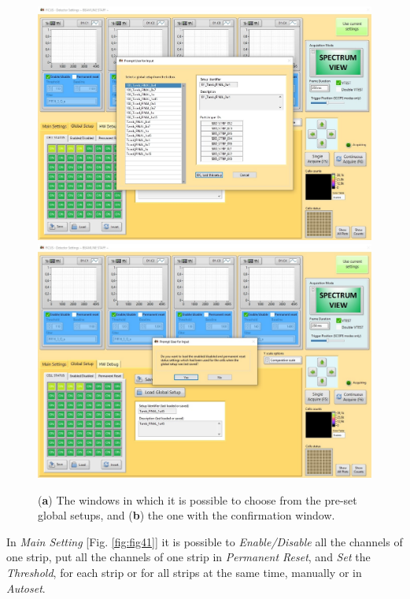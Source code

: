 \documentclass[a4paper,12pt,oneside,pdflatex,italian,final,twocolumn]{article}
\begin{document}
\begin{figure}[h]
\centering
\subfloat
{\includegraphics[width=.85\textwidth]{Cattura100.jpg}} \\
\subfloat
{\includegraphics[width=.85\textwidth]{Cattura101.jpg}} 
\caption{(\textbf{a}) The windows in which it is possible to choose from the pre-set global setups, and (\textbf{b}) the one with the confirmation window.}\label{fig:fig40}
\end{figure}

In \textit{Main Setting} [Fig. \ref{fig:fig41}] it is possible to \textit{Enable/Disable} all the channels of one strip, put all the channels of one strip in \textit{Permanent Reset}, and \textit{Set} the \textit{Threshold}, for each strip or for all strips at the same time, manually or in \textit{Autoset}.
\end{document}
